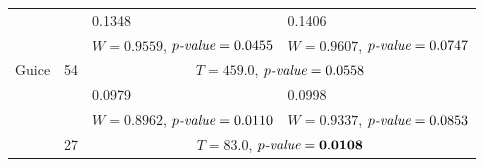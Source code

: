 \documentclass[twoside,a4paper,11pt]{memoir}
\begin{document}
\begin{table}[]
\begin{adjustbox}{center}
\begin{tabular}{llll}
 &  & 0.1348 & 0.1406 \\
 &  & $W = 0.9559$, $p\emph{-value} = 0.0455$ & $W = 0.9607$, $p\emph{-value} = 0.0747$ \\
\multirow{-3}{*}{Guice} & \multirow{-3}{*}{54} & \multicolumn{2}{c}{$T = 459.0$, $p\emph{-value} = 0.0558$} \\
\rowcolor{Gray}
\cellcolor{Gray} & \cellcolor{Gray} & 0.0979 & 0.0998 \\
\rowcolor{Gray}
\cellcolor{Gray} & \cellcolor{Gray} & $W = 0.8962$, $p\emph{-value} = 0.0110$ & $W = 0.9337$, $p\emph{-value} = 0.0853$ \\
\rowcolor{Gray}
\multirow{-3}{*}{\cellcolor{Gray}Jsoup} & \multirow{-3}{*}{\cellcolor{Gray}27} & \multicolumn{2}{c}{\cellcolor{Gray}$T = 83.0$, $p\emph{-value} = \mathbf{0.0108}$}\\
\bottomrule
\end{tabular}
\end{adjustbox}
\end{table}
\end{document}

